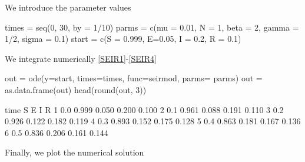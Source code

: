 \documentclass[12pt]{article}\usepackage[]{graphicx}\usepackage[]{color}
\begin{document}
We introduce the parameter values

\begin{Schunk}
\begin{Sinput}
times = seq(0, 30, by = 1/10)
parms = c(mu = 0.01, N = 1, beta = 2, gamma = 1/2, sigma = 0.1)
start = c(S = 0.999, E=0.05, I = 0.2, R = 0.1)
\end{Sinput}
\end{Schunk}


We integrate numerically \eqref{SEIR1}-\eqref{SEIR4}

\begin{Schunk}
\begin{Sinput}
out = ode(y=start, times=times, func=seirmod, parms= parms)
out = as.data.frame(out) 
head(round(out, 3))
\end{Sinput}
\begin{Soutput}
  time     S     E     I     R
1  0.0 0.999 0.050 0.200 0.100
2  0.1 0.961 0.088 0.191 0.110
3  0.2 0.926 0.122 0.182 0.119
4  0.3 0.893 0.152 0.175 0.128
5  0.4 0.863 0.181 0.167 0.136
6  0.5 0.836 0.206 0.161 0.144
\end{Soutput}
\end{Schunk}

Finally, we plot the numerical solution
\end{document}
